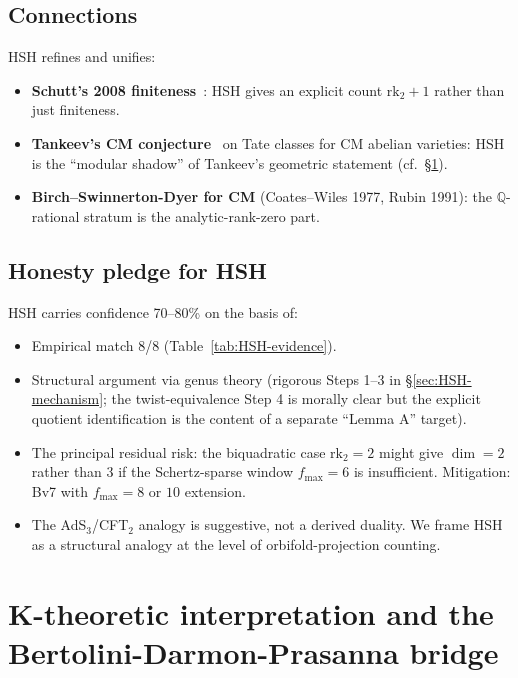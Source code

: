 \documentclass[11pt,a4paper]{amsart}
\theoremstyle{definition}
\newcommand{\Q}{\mathbb{Q}}
\newcommand{\rktwo}{\mathrm{rk}_2}
\begin{document}
\subsection{Connections}\label{sec:HSH-connections}

HSH refines and unifies:
\begin{itemize}[leftmargin=2em]
  \item \textbf{Schutt's 2008 finiteness}~\cite{Schutt2008}: HSH gives an explicit count $\rktwo + 1$ rather than just finiteness.
  \item \textbf{Tankeev's CM conjecture}~\cite{Tankeev1982} on Tate classes for CM abelian varieties: HSH is the ``modular shadow'' of Tankeev's geometric statement (cf.\ \S\ref{sec:Ktheory}).
  \item \textbf{Birch--Swinnerton-Dyer for CM} (Coates--Wiles 1977, Rubin 1991): the $\Q$-rational stratum is the analytic-rank-zero part.
\end{itemize}

\subsection{Honesty pledge for HSH}\label{sec:HSH-honesty}

HSH carries confidence 70--80\% on the basis of:
\begin{itemize}[leftmargin=2em]
  \item Empirical match 8/8 (Table~\ref{tab:HSH-evidence}).
  \item Structural argument via genus theory (rigorous Steps 1--3 in \S\ref{sec:HSH-mechanism}; the twist-equivalence Step 4 is morally clear but the explicit quotient identification is the content of a separate ``Lemma A'' target).
  \item The principal residual risk: the biquadratic case $\rktwo = 2$ might give $\dim = 2$ rather than $3$ if the Schertz-sparse window $f_{\max} = 6$ is insufficient. Mitigation: Bv7 with $f_{\max} = 8$ or $10$ extension.
  \item The AdS$_3$/CFT$_2$ analogy is suggestive, not a derived duality. We frame HSH as a structural analogy at the level of orbifold-projection counting.
\end{itemize}


\section{K-theoretic interpretation and the Bertolini-Darmon-Prasanna bridge}\label{sec:Ktheory}
\end{document}
